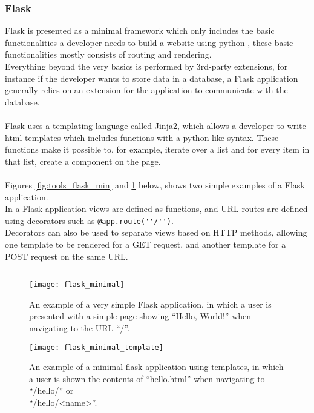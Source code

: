 \subsubsection{Flask}
Flask \cite{Flask_docs} is presented as a minimal framework which only includes the basic functionalities a developer needs to build a website using python \cite{Flask_what}, these basic functionalities mostly consists of routing and rendering.\\
Everything beyond the very basics is performed by 3rd-party extensions, for instance if the developer wants to store data in a database, a Flask application generally relies on an extension for the application to communicate with the database.\\\\
Flask uses a templating language called Jinja2, which allows a developer to write html templates which includes functions with a python like syntax. These functions make it possible to, for example, iterate over a list and for every item in that list, create a component on the page.\\\\
Figures \ref{fig:tools_flask_min} and \ref{fig:tools_flask_min_template} below, shows two simple examples of a Flask application.\\In a Flask application views are defined as functions, and URL routes are defined using decorators such as \verb|@app.route(''/'')|.\\Decorators can also be used to separate views based on HTTP methods, allowing one template to be rendered for a GET request, and another template for a POST request on the same URL.
\begin{figure}[b!]
\centering
\hrule
\vspace*{0.2cm}
\texttt{[image: flask\_minimal]}
\caption{An example of a very simple Flask application, in which a user is presented with a simple page showing ``Hello, World!'' when navigating to the URL ``/''.}
\label{fig:tools_flask_min}
\texttt{[image: flask\_minimal\_template]}
\caption{An example of a minimal flask application using templates, in which a user is shown the contents of ``hello.html'' when navigating to ``/hello/'' or\\``/hello/<name>''.}
\label{fig:tools_flask_min_template}
\end{figure}
